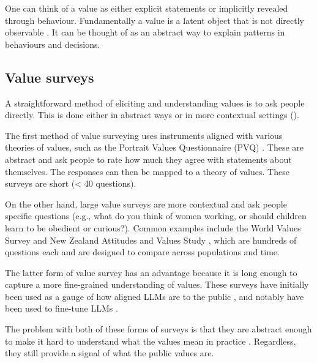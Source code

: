 One can think of a value as either explicit statements or implicitly revealed through behaviour. Fundamentally a value is a latent object that is not directly observable \cite{rokeachNatureHumanValues1973,schwartzAreThereUniversal1994}. It can be thought of as an abstract way to explain patterns in behaviours and decisions.

\subsection{Value surveys}

A straightforward method of eliciting and understanding values is to ask people directly. This is done either in abstract ways or in more contextual settings ().

The first method of value surveying uses instruments aligned with various theories of values, such as the Portrait Values Questionnaire (PVQ) \cite{schwartzRefiningTheoryBasic2012}. These are abstract and ask people to rate how much they agree with statements about themselves. The responses can then be mapped to a theory of values. These surveys are short (< 40 questions).

On the other hand, large value surveys are more contextual and ask people specific questions (e.g., what do you think of women working, or should children learn to be obedient or curious?). Common examples include the World Values Survey \cite{WVS2020} and New Zealand Attitudes and Values Study \cite{NZAVS2025}, which are hundreds of questions each and are designed to compare across populations and time. 

The latter form of value survey has an advantage because it is long enough to capture a more fine-grained understanding of values. These surveys have initially been used as a gauge of how aligned LLMs are to the public \cite{durmusMeasuringRepresentationSubjective2024,santurkarWhoseOpinionsLanguage2023,zhaoWorldValuesBenchLargeScaleBenchmark2024,taoCulturalBiasCultural2024,aroraProbingPreTrainedLanguage2025}, and notably have been used to fine-tune LLMs \cite{nieSurveytoBehaviorDownstreamAlignment2025,suhLanguageModelFineTuning2025,caoSpecializingLargeLanguage2025,huangDistributionShiftAlignment2025}.

The problem with both of these forms of surveys is that they are abstract enough to make it hard to understand what the values mean in practice \cite{klingefjordWhatAreHuman2024,rottgerPoliticalCompassSpinning2024,nguyenMeasurementValidityLLM2026}. Regardless, they still provide a signal of what the public values are.

